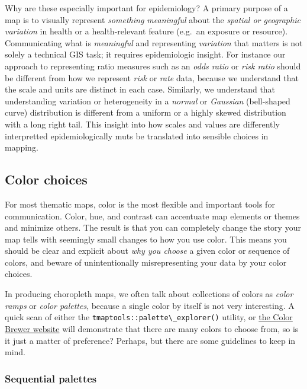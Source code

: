 \documentclass[
]{book}
\newcommand{\passthrough}[1]{#1}
\begin{document}
Why are these especially important for epidemiology? A primary purpose of a map is to visually represent \emph{something meaningful} about the \emph{spatial or geographic variation} in health or a health-relevant feature (e.g.~an exposure or resource). Communicating what is \emph{meaningful} and representing \emph{variation} that matters is not solely a technical GIS task; it requires epidemiologic insight. For instance our approach to representing ratio measures such as an \emph{odds ratio} or \emph{risk ratio} should be different from how we represent \emph{risk} or \emph{rate} data, because we understand that the scale and units are distinct in each case. Similarly, we understand that understanding variation or heterogeneity in a \emph{normal} or \emph{Gaussian} (bell-shaped curve) distribution is different from a uniform or a highly skewed distribution with a long right tail. This insight into how scales and values are differently interpretted epidemiologically muts be translated into sensible choices in mapping.

\hypertarget{color-choices}{%
\subsection{Color choices}\label{color-choices}}

For most thematic maps, color is the most flexible and important tools for communication. Color, hue, and contrast can accentuate map elements or themes and minimize others. The result is that you can completely change the story your map tells with seemingly small changes to how you use color. This means you should be clear and explicit about \emph{why you choose} a given color or sequence of colors, and beware of unintentionally misrepresenting your data by your color choices.

In producing choropleth maps, we often talk about collections of colors as \emph{color ramps} or \emph{color palettes}, because a single color by itself is not very interesting. A quick scan of either the \passthrough{\lstinline!tmaptools::palette\_explorer()!} utility, or \href{http://colorbrewer2.org/\#}{the Color Brewer website} will demonstrate that there are many colors to choose from, so is it just a matter of preference? Perhaps, but there are some guidelines to keep in mind.

\hypertarget{sequential-palettes}{%
\subsubsection{Sequential palettes}\label{sequential-palettes}}
\end{document}
